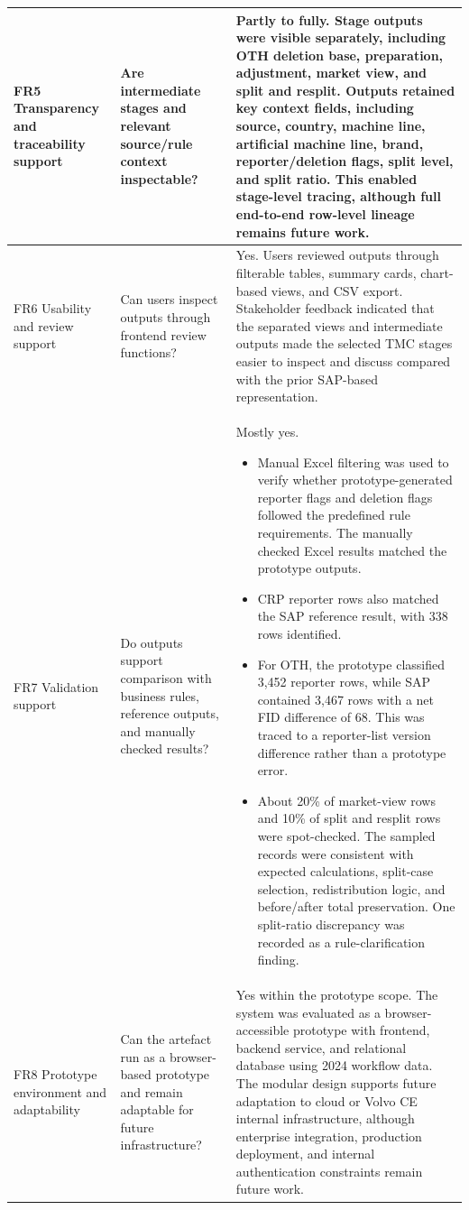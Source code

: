 \begin{longtable}{|>{\raggedright\arraybackslash}p{2.2cm}|>{\raggedright\arraybackslash}p{3.0cm}|>{\raggedright\arraybackslash}p{5.7cm}|}
FR5 Transparency and traceability support & Are intermediate stages and relevant source/rule context inspectable? & Partly to fully. Stage outputs were visible separately, including OTH deletion base, preparation, adjustment, market view, and split and resplit. Outputs retained key context fields, including source, country, machine line, artificial machine line, brand, reporter/deletion flags, split level, and split ratio. This enabled stage-level tracing, although full end-to-end row-level lineage remains future work. \\
\hline

FR6 Usability and review support & Can users inspect outputs through frontend review functions? & Yes. Users reviewed outputs through filterable tables, summary cards, chart-based views, and CSV export. Stakeholder feedback indicated that the separated views and intermediate outputs made the selected TMC stages easier to inspect and discuss compared with the prior SAP-based representation. \\
\hline

FR7 Validation support & Do outputs support comparison with business rules, reference outputs, and manually checked results? & 
Mostly yes.
\begin{itemize}[leftmargin=*, nosep]
    \item Manual Excel filtering was used to verify whether prototype-generated reporter flags and deletion flags followed the predefined rule requirements. The manually checked Excel results matched the prototype outputs.
    \item CRP reporter rows also matched the SAP reference result, with 338 rows identified.
    \item For OTH, the prototype classified 3,452 reporter rows, while SAP contained 3,467 rows with a net FID difference of 68. This was traced to a reporter-list version difference rather than a prototype error.
    \item About 20\% of market-view rows and 10\% of split and resplit rows were spot-checked. The sampled records were consistent with expected calculations, split-case selection, redistribution logic, and before/after total preservation. One split-ratio discrepancy was recorded as a rule-clarification finding.
\end{itemize}
\\
\hline

FR8 Prototype environment and adaptability & Can the artefact run as a browser-based prototype and remain adaptable for future infrastructure? & Yes within the prototype scope. The system was evaluated as a browser-accessible prototype with frontend, backend service, and relational database using 2024 workflow data. The modular design supports future adaptation to cloud or Volvo CE internal infrastructure, although enterprise integration, production deployment, and internal authentication constraints remain future work. \\
\hline


\end{longtable}
